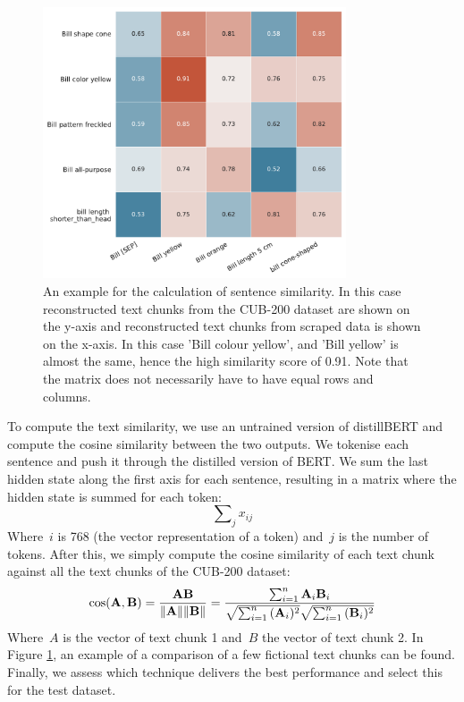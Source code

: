 \documentclass[a4paper, 12pt, oneside]{book} %
\begin{document}
\begin{figure} [htbp]
    \centering
    \hspace{-3cm}
    \includegraphics[width=0.8\textwidth]{similarity_matrix.pdf}
    \caption[Example of sentence similarity]{An example for the calculation of sentence similarity. 
    In this case reconstructed text chunks from the CUB-200 dataset are shown on the y-axis and reconstructed text chunks from scraped data is shown on the x-axis. In this case 'Bill colour yellow', and 'Bill yellow' is almost the same, hence the high similarity score of 0.91. Note that the matrix does not necessarily have to have equal rows and columns.}
    \label{fig:similarity_matrix}
\end{figure}



To compute the text similarity, we use an untrained version of distillBERT and compute the cosine similarity between the two outputs.
We tokenise each sentence and push it through the distilled version of BERT.
We sum the last hidden state along the first axis for each sentence, resulting in a matrix where the hidden state is summed for each token:
\begin{equation}
     \sum\nolimits_{j}^{} x_{ij} 
\end{equation}
Where~$i$ is 768 (the vector representation of a token) and~$j$ is the number of tokens. 
After this, we simply compute the cosine similarity of each text chunk against all the text chunks of the CUB-200 dataset:
\begin{equation}
\cos ({\bf A},{\bf B})= {{\bf A} {\bf B} \over \|{\bf A}\| \|{\bf B}\|} = \frac{ \sum_{i=1}^{n}{{\bf A}_i{\bf B}_i} }{ \sqrt{\sum_{i=1}^{n}{({\bf A}_i)^2}} \sqrt{\sum_{i=1}^{n}{({\bf B}_i)^2}} }
\end{equation} \label{eq:cosine_sim}
Where~$A$ is the vector of text chunk 1 and~$B$ the vector of text chunk 2. 
In Figure \ref{fig:similarity_matrix}, an example of a comparison of a few fictional text chunks can be found. 
Finally, we assess which technique delivers the best performance and select this for the test dataset.
\end{document}
